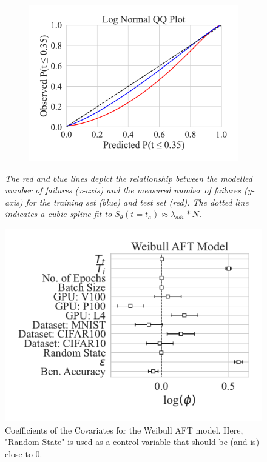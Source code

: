\documentclass[conference]{IEEEtran}
\newcommand{\cm}[1]{\textit{{\color{blue}#1}}}
\begin{document}
{\begin{figure}[h!]
\begin{subfigure}[b]{.3\linewidth}
        \includegraphics[width=\linewidth,clip]{plots/combined/log_normal_qq.pdf}
        \caption{}
    \end{subfigure}
    \caption{\cm{The red and blue lines depict the relationship between the modelled number of failures (x-axis) and the measured number of failures (y-axis) for the training set (blue) and test set (red). The dotted line indicates a cubic spline fit to $S_{\theta}(t=t_a) \approx \lambda_{adv} * N $.}}
    \label{fig:qq}
\end{figure}
\begin{figure}[h!]
    \centering
    \captionsetup[subfigure]{skip=0pt} %
        \centering
        \includegraphics[width=.5\textwidth]{plots/combined/weibull_aft.pdf}
        \caption{Coefficients of the Covariates for the Weibull AFT model. Here, "Random State" is used as a control variable that should be (and is) close to 0.}
        \label{fig:aft}
\end{figure}

}
\end{document}
